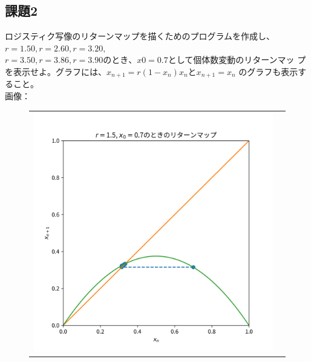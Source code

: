 \subsection{課題2}
ロジスティク写像のリターンマップを描くためのプログラムを作成し、$r = 1.50, r = 2.60, r = 3.20,$ \\
$r = 3.50, r = 3.86, r = 3.90 のとき、x0 = 0.7$として個体数変動のリターンマッ
プを表示せよ。グラフには、$x_{n+1} = r(1 −x_n)x_n とx_{n+1} = x_n$ のグラフも表示すること。\\
画像：\\
\begin{figure}[htbp]
  \begin{tabular}{cc}
    \begin{minipage}[t]{0.45\hsize}
      \centering
      \includegraphics[keepaspectratio, scale=0.3]{images/Problem1/ctest2_1_2.png}
    \end{minipage} &
    \begin{minipage}[t]{0.45\hsize}
      \centering

\end{minipage}
\end{tabular}
\end{figure}

